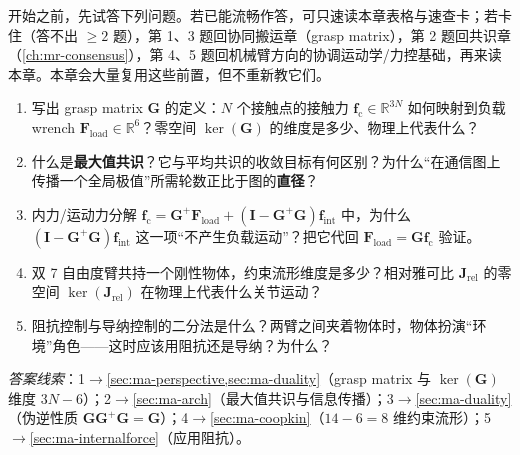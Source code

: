 \begin{practice}[前置自测]
开始之前，先试答下列问题。若已能流畅作答，可只速读本章表格与速查卡；若卡住（答不出 $\ge 2$ 题），第 1、3 题回协同搬运章（grasp matrix），第 2 题回共识章（\cref{ch:mr-consensus}），第 4、5 题回机械臂方向的协调运动学/力控基础，再来读本章。本章会大量复用这些前置，但不重新教它们。
\begin{enumerate}
  \item 写出 grasp matrix $\mathbf{G}$ 的定义：$N$ 个接触点的接触力 $\mathbf{f}_{\text{c}}\in\mathbb{R}^{3N}$ 如何映射到负载 wrench $\mathbf{F}_{\text{load}}\in\mathbb{R}^6$？零空间 $\ker(\mathbf{G})$ 的维度是多少、物理上代表什么？
  \item 什么是\textbf{最大值共识}？它与平均共识的收敛目标有何区别？为什么“在通信图上传播一个全局极值”所需轮数正比于图的\textbf{直径}？
  \item 内力/运动力分解 $\mathbf{f}_{\text{c}}=\mathbf{G}^{+}\mathbf{F}_{\text{load}}+(\mathbf{I}-\mathbf{G}^{+}\mathbf{G})\mathbf{f}_{\text{int}}$ 中，为什么 $(\mathbf{I}-\mathbf{G}^{+}\mathbf{G})\mathbf{f}_{\text{int}}$ 这一项“不产生负载运动”？把它代回 $\mathbf{F}_{\text{load}}=\mathbf{G}\mathbf{f}_{\text{c}}$ 验证。
  \item 双 7 自由度臂共持一个刚性物体，约束流形维度是多少？相对雅可比 $\mathbf{J}_{\text{rel}}$ 的零空间 $\ker(\mathbf{J}_{\text{rel}})$ 在物理上代表什么关节运动？
  \item 阻抗控制与导纳控制的二分法是什么？两臂之间夹着物体时，物体扮演“环境”角色——这时应该用阻抗还是导纳？为什么？
\end{enumerate}
\noindent\emph{答案线索}：1$\to$\cref{sec:ma-perspective,sec:ma-duality}（grasp matrix 与 $\ker(\mathbf{G})$ 维度 $3N-6$）；2$\to$\cref{sec:ma-arch}（最大值共识与信息传播）；3$\to$\cref{sec:ma-duality}（伪逆性质 $\mathbf{G}\mathbf{G}^{+}\mathbf{G}=\mathbf{G}$）；4$\to$\cref{sec:ma-coopkin}（$14-6=8$ 维约束流形）；5$\to$\cref{sec:ma-internalforce}（应用阻抗）。
\end{practice}

